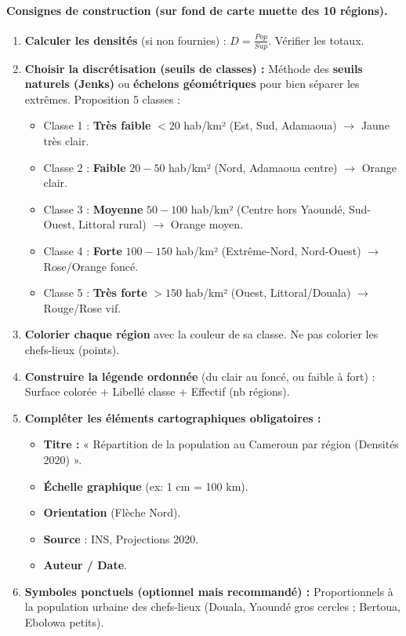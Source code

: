 \documentclass[11pt]{article}
\begin{document}
\paragraph{Consignes de construction (sur fond de carte muette des 10 régions).}

\begin{methode}
\begin{enumerate}
    \item \textbf{Calculer les densités} (si non fournies) : $D = \frac{Pop}{Sup}$. Vérifier les totaux.
    \item \textbf{Choisir la discrétisation (seuils de classes) :} Méthode des \textbf{seuils naturels (Jenks)} ou \textbf{échelons géométriques} pour bien séparer les extrêmes. Proposition 5 classes :
        \begin{itemize}
            \item Classe 1 : \textbf{Très faible} $< 20$ hab/km² (Est, Sud, Adamaoua) $\rightarrow$ \textcolor{popgoldL!80}{Jaune très clair}.
            \item Classe 2 : \textbf{Faible} $20 - 50$ hab/km² (Nord, Adamaoua centre) $\rightarrow$ \textcolor{poporangeL!60}{Orange clair}.
            \item Classe 3 : \textbf{Moyenne} $50 - 100$ hab/km² (Centre hors Yaoundé, Sud-Ouest, Littoral rural) $\rightarrow$ \textcolor{poporange!60}{Orange moyen}.
            \item Classe 4 : \textbf{Forte} $100 - 150$ hab/km² (Extrême-Nord, Nord-Ouest) $\rightarrow$ \textcolor{poppink!60}{Rose/Orange foncé}.
            \item Classe 5 : \textbf{Très forte} $> 150$ hab/km² (Ouest, Littoral/Douala) $\rightarrow$ \textcolor{poppink}{Rouge/Rose vif}.
        \end{itemize}
    \item \textbf{Colorier chaque région} avec la couleur de sa classe. Ne pas colorier les chefs-lieux (points).
    \item \textbf{Construire la légende ordonnée} (du clair au foncé, ou faible à fort) : Surface colorée + Libellé classe + Effectif (nb régions).
    \item \textbf{Compléter les éléments cartographiques obligatoires :}
        \begin{itemize}
            \item \textbf{Titre :} « Répartition de la population au Cameroun par région (Densités 2020) ».
            \item \textbf{Échelle graphique} (ex: 1 cm = 100 km).
            \item \textbf{Orientation} (Flèche Nord).
            \item \textbf{Source} : INS, Projections 2020.
            \item \textbf{Auteur / Date}.
        \end{itemize}
    \item \textbf{Symboles ponctuels (optionnel mais recommandé) :} Proportionnels à la population urbaine des chefs-lieux (Douala, Yaoundé gros cercles ; Bertoua, Ebolowa petits).
\end{enumerate}
\end{methode}
\end{document}
